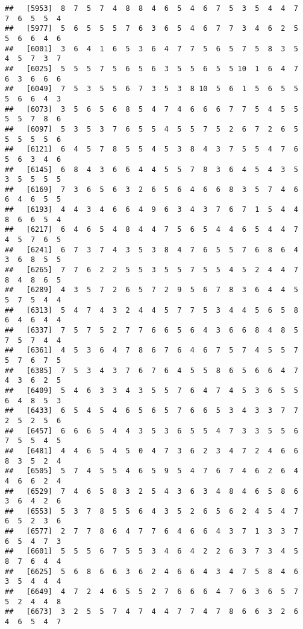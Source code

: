 \documentclass[
]{book}
\begin{document}
\begin{verbatim}
##   [5953]  8  7  5  7  4  8  8  4  6  5  4  6  7  5  3  5  4  4  7  7  6  5  5  4
##   [5977]  5  6  5  5  5  7  6  3  6  5  4  6  7  7  3  4  6  2  5  5  6  6  4  6
##   [6001]  3  6  4  1  6  5  3  6  4  7  7  5  6  5  7  5  8  3  5  4  5  7  3  7
##   [6025]  5  5  5  7  5  6  5  6  3  5  5  6  5  5 10  1  6  4  7  6  3  6  6  6
##   [6049]  7  5  3  5  5  6  7  3  5  3  8 10  5  6  1  5  6  5  5  5  6  6  4  3
##   [6073]  3  5  6  5  6  8  5  4  7  4  6  6  6  7  7  5  4  5  5  5  5  7  8  6
##   [6097]  5  3  5  3  7  6  5  5  4  5  5  7  5  2  6  7  2  6  5  5  5  5  5  6
##   [6121]  6  4  5  7  8  5  5  4  5  3  8  4  3  7  5  5  4  7  6  5  6  3  4  6
##   [6145]  6  8  4  3  6  6  4  4  5  5  7  8  3  6  4  5  4  3  5  3  5  5  5  5
##   [6169]  7  3  6  5  6  3  2  6  5  6  4  6  6  8  3  5  7  4  6  6  4  6  5  5
##   [6193]  4  4  3  4  6  6  4  9  6  3  4  3  7  6  7  1  5  4  4  8  6  6  5  4
##   [6217]  6  4  6  5  4  8  4  4  7  5  6  5  4  4  6  5  4  4  7  4  5  7  6  5
##   [6241]  6  7  3  7  4  3  5  3  8  4  7  6  5  5  7  6  8  6  4  3  6  8  5  5
##   [6265]  7  7  6  2  2  5  5  3  5  5  7  5  5  4  5  2  4  4  7  8  4  8  6  5
##   [6289]  4  3  5  7  2  6  5  7  2  9  5  6  7  8  3  6  4  4  5  5  7  5  4  4
##   [6313]  5  4  7  4  3  2  4  4  5  7  7  5  3  4  4  5  6  5  8  6  4  6  4  4
##   [6337]  7  5  7  5  2  7  7  6  6  5  6  4  3  6  6  8  4  8  5  7  5  7  4  4
##   [6361]  4  5  3  6  4  7  8  6  7  6  4  6  7  5  7  4  5  5  7  5  7  6  7  5
##   [6385]  7  5  3  4  3  7  6  7  6  4  5  5  8  6  5  6  6  4  7  4  3  6  2  5
##   [6409]  5  4  6  3  3  4  3  5  5  7  6  4  7  4  5  3  6  5  5  6  4  8  5  3
##   [6433]  6  5  4  5  4  6  5  6  5  7  6  6  5  3  4  3  3  7  7  2  5  2  5  6
##   [6457]  6  6  6  5  4  4  3  5  3  6  5  5  4  7  3  3  5  5  6  7  5  5  4  5
##   [6481]  4  4  6  5  4  5  0  4  7  3  6  2  3  4  7  2  4  6  6  8  3  5  2  4
##   [6505]  5  7  4  5  5  4  6  5  9  5  4  7  6  7  4  6  2  6  4  4  6  6  2  4
##   [6529]  7  4  6  5  8  3  2  5  4  3  6  3  4  8  4  6  5  8  6  3  6  4  2  6
##   [6553]  5  3  7  8  5  5  6  4  3  5  2  6  5  6  2  4  5  4  7  6  5  2  3  6
##   [6577]  2  7  7  8  6  4  7  7  6  4  6  6  4  3  7  1  3  3  7  6  5  4  7  3
##   [6601]  5  5  5  6  7  5  5  3  4  6  4  2  2  6  3  7  3  4  5  8  7  6  4  4
##   [6625]  5  6  8  6  6  3  6  2  4  6  6  4  3  4  7  5  8  4  6  3  5  4  4  4
##   [6649]  4  7  2  4  6  5  5  2  7  6  6  6  4  7  6  3  6  5  7  5  2  4  4  8
##   [6673]  3  2  5  5  7  4  7  4  4  7  7  4  7  8  6  6  3  2  6  4  6  5  4  7

\end{verbatim}
\end{document}
